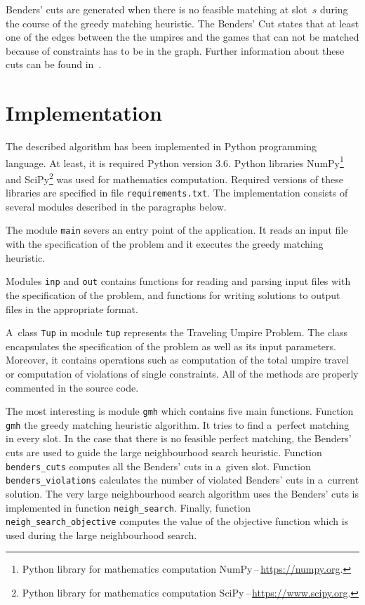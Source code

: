 \documentclass[a4paper, 10pt, twocolumn]{article}
\begin{document}
    Benders' cuts are generated when there is no feasible matching at
    slot~$ s $ during the course of the greedy matching heuristic.
    The Benders' Cut states that at least one of the edges between the
    the umpires and the games that can not be matched because of constraints
    has to be in the graph. Further information about these cuts can be
    found in~\cite{bendersCutsPaper}.


    \section{Implementation}
    \label{sec:implementation}

    The described algorithm has been implemented in Python programming
    language. At least, it is required Python version 3.6. Python libraries
    NumPy\footnote{Python library for mathematics computation
    NumPy\,--\,\url{https://numpy.org}.} and SciPy\footnote{Python library
    for mathematics computation SciPy\,--\,\url{https://www.scipy.org}.}
    was used for mathematics computation. Required versions of these
    libraries are specified in file \texttt{requirements.txt}. The
    implementation consists of several modules described in the paragraphs
    below.

    The module \texttt{main} severs an entry point of the application.
    It reads an input file with the specification of the problem and
    it executes the greedy matching heuristic.

    Modules \texttt{inp} and \texttt{out} contains functions for reading
    and parsing input files with the specification of the problem, and
    functions for writing solutions to output files in the appropriate
    format.

    A~class \texttt{Tup} in module \texttt{tup} represents the Traveling
    Umpire Problem. The class encapsulates the specification of the problem
    as well as its input parameters. Moreover, it contains operations such
    as computation of the total umpire travel or computation of violations
    of single constraints. All of the methods are properly commented in
    the source code.

    The most interesting is module \texttt{gmh} which contains five main
    functions. Function \texttt{gmh} the greedy matching heuristic
    algorithm. It tries to find a~perfect matching in every slot. In the
    case that there is no feasible perfect matching, the Benders' cuts
    are used to guide the large neighbourhood search heuristic. Function
    \texttt{benders\_cuts} computes all the Benders' cuts in a~given slot.
    Function \texttt{benders\_violations} calculates the number of
    violated Benders' cuts in a~current solution. The very large
    neighbourhood search algorithm uses the Benders' cuts is implemented
    in function \texttt{neigh\_search}. Finally, function
    \texttt{neigh\_search\_objective} computes the value of the objective
    function which is used during the large neighbourhood search.
\end{document}
